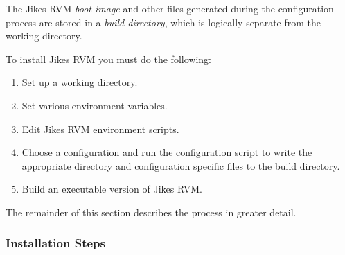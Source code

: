 The Jikes RVM {\em boot image} and other files generated during the 
configuration process
are stored in a {\em build directory},
 which is logically separate from the working directory. 

To install Jikes RVM  you must do the following:
\begin{enumerate}
\item Set up a working directory.
\item Set various environment variables.
\item Edit Jikes RVM environment scripts.
\item Choose a configuration and run the configuration script to write
the appropriate directory and configuration specific files to the
build directory.
\item Build an executable version of Jikes RVM.\@
\end{enumerate}

The remainder of this section describes the process in greater detail.

\subsubsection{Installation Steps}%
\label{sub-sub-sec:InstallationSteps}%
\label{sec:manual-classpath-root}%
\label{single-virtual-processor-subsubsection}


